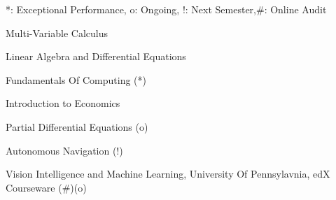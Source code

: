 
\begin{cventries}

  \cventry
    {*: Exceptional Performance,  o: Ongoing,   !: Next Semester,\#: Online Audit}{}{}{}{\begin{cvitems}
        \item {Multi-Variable Calculus}
        \item {Linear Algebra and Differential Equations}
        \item {Fundamentals Of Computing (*)}
        \item {Introduction to Economics}
        \item {Partial Differential Equations (o)}
        \item {Autonomous Navigation (!)}
        \item {Vision Intelligence and Machine Learning, University Of Pennsylavnia, edX Courseware (\#)(o)}
      \end{cvitems}
      }
  \end{cventries}
